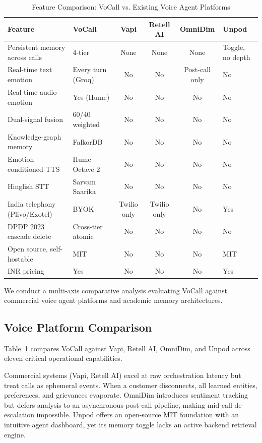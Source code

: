 \documentclass[conference]{IEEEtran}
\begin{document}
\begin{table}[t]
\centering
\caption{Feature Comparison: VoCall vs. Existing Voice Agent Platforms}
\label{tab:comparison}
\footnotesize
\begin{tabularx}{\textwidth}{@{}p{5.0cm} p{2.8cm} c c c X@{}}
\toprule
\textbf{Feature} & \textbf{VoCall} & \textbf{Vapi} & \textbf{Retell AI} & \textbf{OmniDim} & \textbf{Unpod} \\
\midrule
Persistent memory across calls & 4-tier & None & None & None & Toggle, no depth \\
Real-time text emotion & Every turn (Groq) & No & No & Post-call only & No \\
Real-time audio emotion & Yes (Hume) & No & No & No & No \\
Dual-signal fusion & 60/40 weighted & No & No & No & No \\
Knowledge-graph memory & FalkorDB & No & No & No & No \\
Emotion-conditioned TTS & Hume Octave 2 & No & No & No & No \\
Hinglish STT & Sarvam Saarika & No & No & No & No \\
India telephony (Plivo/Exotel) & BYOK & Twilio only & Twilio only & No & Yes \\
DPDP 2023 cascade delete & Cross-tier atomic & No & No & No & No \\
Open source, self-hostable & MIT & No & No & No & MIT \\
INR pricing & Yes & No & No & No & Yes \\
\bottomrule
\end{tabularx}
\end{table}


We conduct a multi-axis comparative analysis evaluating VoCall against commercial voice agent platforms and academic memory architectures.

\subsection{Voice Platform Comparison}
Table~\ref{tab:comparison} compares VoCall against Vapi, Retell AI, OmniDim, and Unpod across eleven critical operational capabilities. 

Commercial systems (Vapi, Retell AI) excel at raw orchestration latency but treat calls as ephemeral events. When a customer disconnects, all learned entities, preferences, and grievances evaporate. OmniDim introduces sentiment tracking but defers analysis to an asynchronous post-call pipeline, making mid-call de-escalation impossible. Unpod offers an open-source MIT foundation with an intuitive agent dashboard, yet its memory toggle lacks an active backend retrieval engine. 
\end{document}
